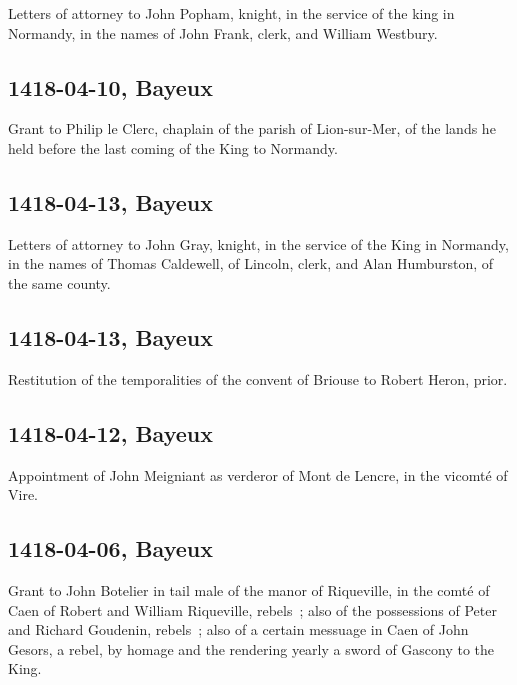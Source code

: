 \documentclass[a4paper,12pt,twoside]{book}
\begin{document}
                     Letters of attorney to John Popham, knight, in the service of the king in Normandy, in the names of John Frank, clerk, and William Westbury.
                  
            \subsection{1418-04-10, Bayeux}
            
                     Grant to Philip le Clerc, chaplain of the parish of Lion-sur-Mer, of the lands he held before the last coming of the King to Normandy.
                  
            \subsection{1418-04-13, Bayeux}
            
                     Letters of attorney to John Gray, knight, in the service of the King in Normandy, in the names of Thomas Caldewell, of Lincoln, clerk, and Alan Humburston, of the same county.
                  
            \subsection{1418-04-13, Bayeux}
            
                     Restitution of the temporalities of the convent of Briouse to Robert Heron, prior.
                  
            \subsection{1418-04-12, Bayeux}
            
                     Appointment of John Meigniant as verderor of Mont de Lencre, in the vicomté of Vire.
                  
            \subsection{1418-04-06, Bayeux}
            
                     Grant to John Botelier in tail male of the manor of Riqueville, in the comté of Caen of Robert and William Riqueville, rebels ; also of the possessions of Peter and Richard Goudenin, rebels ; also of a certain messuage in Caen of John Gesors, a rebel, by homage and the rendering yearly a sword of Gascony to the King.
                  
\end{document}
